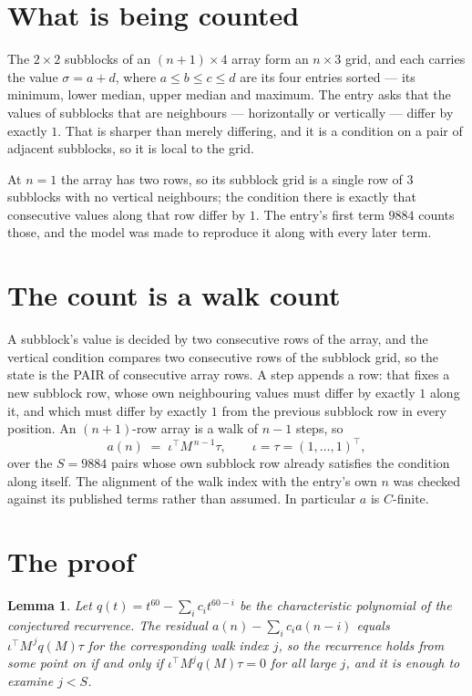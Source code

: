 \documentclass[11pt,a4paper]{article}
\theoremstyle{plain}
\newtheorem{lemma}[theorem]{Lemma}
\theoremstyle{definition}
\begin{document}
\section{What is being counted}

The $2\times2$ subblocks of an $(n+1)\times4$ array form an
$n\times3$ grid, and each carries the value $\sigma=a+d$, where $a\le b\le c\le d$ are its four entries sorted --- its minimum, lower median, upper median and maximum. The entry asks that the values of
subblocks that are neighbours --- horizontally or vertically --- differ by exactly $1$.
That is sharper than merely differing, and it is a condition on a pair of adjacent subblocks,
so it is local to the grid.

At $n=1$ the array has two rows, so its subblock grid is a single row of $3$ subblocks with
no vertical neighbours; the condition there is exactly that consecutive values along that row
differ by $1$. The entry's first term $9884$ counts those, and the model was made to
reproduce it along with every later term.

\section{The count is a walk count}

A subblock's value is decided by two consecutive rows of the array, and the
vertical condition compares two consecutive rows of the subblock grid, so the state is the
PAIR of consecutive array rows. A step appends a row: that fixes a new subblock row, whose own
neighbouring values must differ by exactly $1$ along it, and which must differ by exactly
$1$ from the previous subblock row in every position. An $(n+1)$-row array is a walk of
$n-1$ steps, so
\[
a(n)\;=\;\iota^{\!\top}M^{\,n-1}\tau,\qquad\iota=\tau=(1,\dots,1)^{\!\top},
\]
over the $S=9884$ pairs whose own subblock row already satisfies the condition along itself.
The alignment of the walk index with the entry's own $n$ was checked against its published
terms rather than assumed. In particular $a$ is $C$-finite.

\section{The proof}

\begin{lemma}\label{lem:crit}
Let $q(t)=t^{60}-\sum_i c_it^{60-i}$ be the characteristic polynomial of the
conjectured recurrence. The residual $a(n)-\sum_ic_ia(n-i)$ equals
$\iota^{\!\top}M^{\,j}q(M)\tau$ for the corresponding walk index $j$, so the recurrence
holds from some point on if and only if $\iota^{\!\top}M^{j}q(M)\tau=0$ for all large $j$,
and it is enough to examine $j<S$.
\end{lemma}
\end{document}
